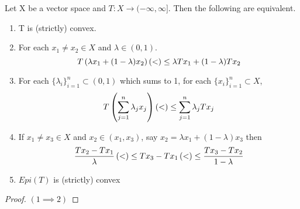 \begin{prop} 
    Let X be a vector space and $T:X \to (-\infty,\infty]$. Then the following are equivalent. 
    \begin{enumerate}
        \item T is (strictly) convex.
        \item For each $x_1 \neq x_2 \in X$ and $\lambda \in (0,1)$.
        \begin{equation}
            T\left( \lambda x_1 + (1-\lambda )x_2\right) \left( <\right) \leq \lambda Tx_1 + (1-\lambda)Tx_2
        \end{equation} 
        \item For each $\{\lambda_i\}_{i=1}^n \subset (0,1)$ which sums to 1, for each $\{x_i\}_{i=1}^n \subset X$, 
        \begin{equation}
            T\left( \sum_{j=1}^n \lambda_j  x_j \right) \left( <\right)\leq \sum_{j=1}^n \lambda_j Tx_j
        \end{equation}
        \item If $x_1 \neq x_3 \in X$ and $x_2 \in (x_1,x_3)$, say $x_2=\lambda x_1+(1-\lambda)x_3$ then 
        \begin{equation} 
            \frac{Tx_2-Tx_1}{\lambda} \left( <\right)\leq Tx_3-Tx_1 \left( <\right)\leq \frac{Tx_3-Tx_2}{1-\lambda}
        \end{equation}
        \item $Epi(T)$ is (strictly) convex
    \end{enumerate} 
    \begin{proof} $(1 \implies  2)$
        

\end{proof}
\end{prop}
